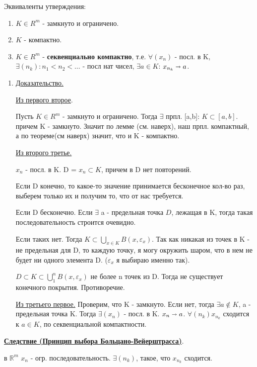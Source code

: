 \documentclass{article}
\newcommand{\thmm}[1]{\underline{\textbf{#1}}}
\begin{document}
Эквиваленты утверждения:
\begin{enumerate}
    \item $K \in R^m$ - замкнуто и ограничено. 
    \item $K$ - компактно.
    \item $K \in R^m$ - \textbf{секвенциально компактно}, т.е. $\forall (x_n)$ - посл. в K, $\exists (n_k):n_1<n_2<\ldots$ - посл нат чисел, $\exists a\in K$: $x_{n_k} \shortrightarrow a$.
\end{enumerate}
\begin{enumerate}
        \item[] \uline{Доказательство.}
        
        \uline{Из первого второе}. 
        
        Пусть $K \in R^m$ - замкнуто и ограничено. Тогда $\exists$ прпл. [a,b]: $K \subset [a,b]$. причем K - замкнуто. Значит по лемме (см. наверх), наш прпл. компактный, а по теореме(см наверх) значит, что и K - компактно.

        \uline{Из второго третье.} 

        $x_n$ - посл. в K. D = ${x_n} \subset K$, причем в D нет повторений.
        
        Если D конечно, то какое-то значение принимается бесконечное кол-во раз, выберем только их и получим то, что от нас требуется.

        Если D бесконечно. Если $\exists$ a - предельная точка $D$, лежащая в K, тогда такая последовательность строится очевидно. 
        
        Если таких нет. Тогда $K \subset \bigcup\limits_{x \in K} B(x,\varepsilon_x) $. Так как никакая из точек в K - не предельная для D, то каждую точку, я могу окружить шаром, что в нем не будет ни одного элемента D. ($\varepsilon_x$ я выбираю именно так). 
        
         $D \subset K \subset \bigcup\limits_{1}^{n} B(x,\varepsilon_x) $ не более n точек из D. Тогда не существует конечного покрытия. 
 Противоречие. 

        \uline{Из третьего первое.} Проверим, что K - замкнуто. Если нет, тогда $\exists a \notin K$, a - предельная точка K. Тогда $\exists (x_n)$ - посл. в K. $x_n \shortrightarrow a$. $\forall (n_k) x_{n_k}$ сходится к $a\in K$, по секвенциальной компактности.
\end{enumerate}

\thmm{Следствие (Принцип выбора Больцано-Вейерштрасса)}.

в $\mathbb{R}^m$ $x_n$ - огр. последовательность. $\exists (n_k)$, такое, что $x_{n_k}$ сходится.
\end{document}
